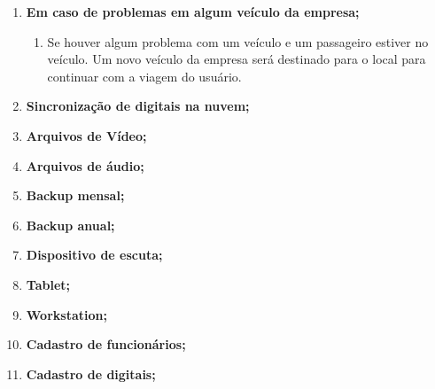\begin{enumerate}
      \item \textbf{Em caso de problemas em algum veículo da empresa;}
            \begin{enumerate}

                  \item	Se houver algum problema com um veículo e um passageiro estiver no veículo. Um novo veículo da empresa será destinado para o local para continuar com a viagem do usuário.



            \end{enumerate}

      \item \textbf{Sincronização de digitais na nuvem;}


      \item \textbf{Arquivos de Vídeo;}


      \item \textbf{Arquivos de áudio;}




      \item \textbf{Backup mensal;}




      \item \textbf{Backup anual;}




      \item \textbf{Dispositivo de escuta;}




      \item \textbf{Tablet;}




      \item \textbf{Workstation;}




      \item \textbf{Cadastro de funcionários;}




      \item \textbf{Cadastro de digitais;}



\end{enumerate}
